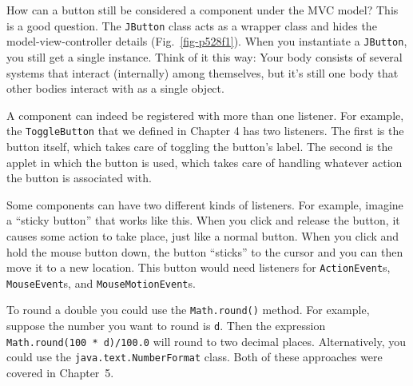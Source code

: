 \secANSH
\begin{ANS}

\begin{figure}[tb]
\end{figure}

\item  How can a button still be considered a component under the MVC model?
This is a good question. The {\tt JButton} class acts as a wrapper
class and hides the model-view-controller details
(Fig.~\ref{fig-p528f1}). When you instantiate a {\tt JButton}, you
still get a single instance.  Think of it this way: Your body consists
of several systems that interact (internally) among themselves, but
it's still one body that other bodies interact with as a single
object. 

\item  A component can indeed be registered with more than one listener.  For
example, the {\tt ToggleButton} that we defined in
Chapter 4 has two listeners. The first is the button
itself, which takes care of toggling the button's label. The second is the
applet in which the button is used, which takes care of handling
whatever action the button is associated with.

\item  Some components can have two different kinds of listeners.  For
example, imagine a ``sticky button'' that works like this. When you
click and release the button, it causes some action to take place,
just like a normal button. When you click and hold the mouse button
down, the button ``sticks'' to the cursor and you can then move it to
a new location. This button would need listeners for
{\tt ActionEvent}s, {\tt MouseEvent}s, and {\tt MouseMotionEvent}s.

\item  To round a double you could use the {\tt Math.round()} method.  For
example, suppose the number you want to round is {\tt d}. Then the
expression {\tt Math.round(100 * d)/100.0} will round to two
decimal places. Alternatively, you could use the
{\tt java.text.Num\-ber\-Format} class. Both of these approaches were covered
in Chapter~5.


\end{ANS}
